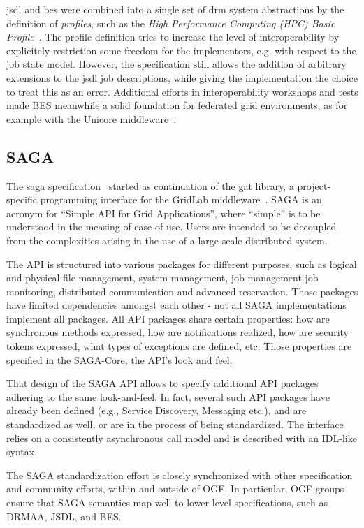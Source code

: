 \documentclass[twocolumn]{svjour3}       %
\begin{document}
\gls{jsdl} and \gls{bes} were combined into a single set of \gls{drm} system abstractions by the definition of \emph{profiles}, such as the \emph{High Performance Computing (HPC) Basic Profile}~\cite{citemaster_9643}. The profile definition tries to increase the level of interoperability by explicitely restriction some freedom for the implementors, e.g. with respect to the job state model. However, the specification still allows the addition of arbitrary extensions to the \gls{jsdl} job descriptions, while giving the implementation the choice to treat this as an error. Additional efforts in interoperability workshops and tests made BES meanwhile a solid foundation for federated grid environments, as for example with the Unicore middleware~\cite{citemaster_9641}.

\subsection{SAGA}

The \gls{saga} specification~\cite{saga} started as continuation of the \gls{gat} library, a project-specific programming interface for the GridLab middleware~\cite{allen03enabling}. SAGA is an acronym for ``Simple API for Grid Applications'', where ``simple'' is to be understood in the measing of ease of use. Users are intended to be decoupled from the complexities arising in the use of a large-scale distributed system. 

The API is structured into various packages for different purposes, such as logical and physical file management, system management, job management job monitoring, distributed communication and advanced reservation.  Those packages have limited dependencies amongst each other - not all SAGA implementations implement all packages.  All API packages share certain properties: how are synchronous methods expressed, how are notifications realized, how are security tokens expressed, what types of exceptions are defined, etc.  Those properties are specified in the SAGA-Core, the API's look and feel.

That design of the SAGA API allows to specify additional API packages adhering to the same look-and-feel.  In fact, several such API packages have already been defined (e.g., Service Discovery, Messaging etc.), and are standardized as well, or are in the process of being standardized. The interface relies on a consistently asynchronous call model and is described with an IDL-like syntax.

The SAGA standardization effort is closely synchronized with other specification and community efforts, within and outside of OGF.  In particular, OGF groups ensure that SAGA semantics map well to lower level specifications, such as DRMAA, JSDL, and BES.
\end{document}
